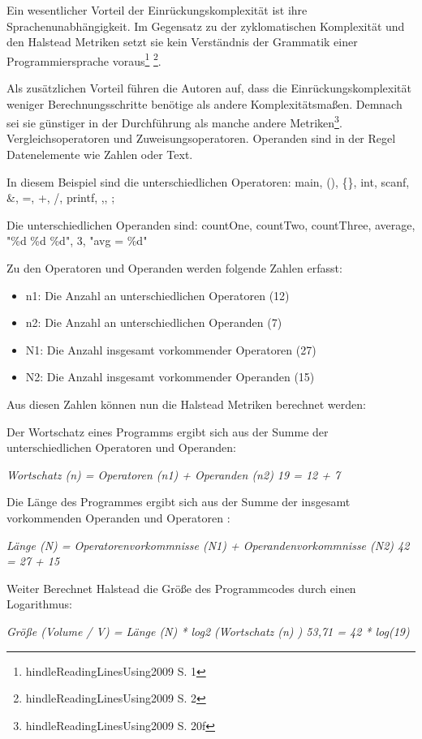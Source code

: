 Ein wesentlicher Vorteil der Einrückungskomplexität ist ihre
Sprachenunabhängigkeit. Im Gegensatz zu der zyklomatischen Komplexität
und den Halstead Metriken setzt sie kein Verständnis der Grammatik einer
Programmiersprache voraus\footnote{hindleReadingLinesUsing2009 S. 1}
\footnote{hindleReadingLinesUsing2009 S. 2}.

Als zusätzlichen Vorteil führen die Autoren auf, dass die
Einrückungskomplexität weniger Berechnungsschritte benötige als andere
Komplexitätsmaßen. Demnach sei sie günstiger in der Durchführung als
manche andere Metriken\footnote{hindleReadingLinesUsing2009 S. 20f}.
Vergleichsoperatoren und Zuweisungsoperatoren. Operanden sind in der
Regel Datenelemente wie Zahlen oder Text.

In diesem Beispiel sind die unterschiedlichen Operatoren: main, (),
\{\}, int, scanf, \&, =, +, /, printf, ,, ;

Die unterschiedlichen Operanden sind: countOne, countTwo, countThree,
average, "\%d \%d \%d", 3, "avg = \%d"

Zu den Operatoren und Operanden werden folgende Zahlen erfasst:

\begin{itemize}
\item
  n1: Die Anzahl an unterschiedlichen Operatoren (12)
\item
  n2: Die Anzahl an unterschiedlichen Operanden (7)
\item
  N1: Die Anzahl insgesamt vorkommender Operatoren (27)
\item
  N2: Die Anzahl insgesamt vorkommender Operanden (15)
\end{itemize}

Aus diesen Zahlen können nun die Halstead Metriken berechnet werden:

Der Wortschatz eines Programms ergibt sich aus der Summe der
unterschiedlichen Operatoren und Operanden:

\emph{Wortschatz (n) = Operatoren (n1) + Operanden (n2) 19 = 12 + 7}

Die Länge des Programmes ergibt sich aus der Summe der insgesamt
vorkommenden Operanden und Operatoren :

\emph{Länge (N) = Operatorenvorkommnisse (N1) + Operandenvorkommnisse
(N2) 42 = 27 + 15}

Weiter Berechnet Halstead die Größe des Programmcodes durch einen
Logarithmus:

\emph{Größe (Volume / V) = Länge (N) * log2 (Wortschatz (n) ) 53,71 = 42
* log(19)}

